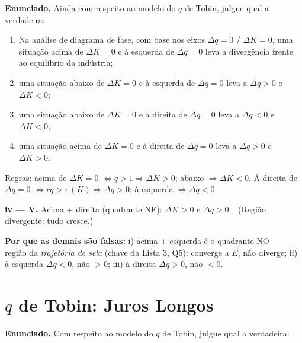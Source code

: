 \documentclass[12pt, a4paper]{article}
\begin{document}
\textbf{Enunciado.} Ainda com respeito ao modelo do $q$ de Tobin, julgue qual
a verdadeira:

\begin{enumerate}[label=\roman*)]
\item Na análise de diagrama de fase, com base nos eixos $\Delta q = 0$ /
$\Delta K = 0$, uma situação acima de $\Delta K = 0$ e à esquerda de
$\Delta q = 0$ leva a divergência frente ao equilíbrio da indústria;
\item uma situação abaixo de $\Delta K = 0$ e à esquerda de $\Delta q = 0$
leva a $\Delta q > 0$ e $\Delta K < 0$;
\item uma situação abaixo de $\Delta K = 0$ e à direita de $\Delta q = 0$
leva a $\Delta q < 0$ e $\Delta K < 0$;
\item uma situação acima de $\Delta K = 0$ e à direita de $\Delta q = 0$
leva a $\Delta q > 0$ e $\Delta K > 0$.
\end{enumerate}

\begin{correctbox}[title={Resposta: iv) --- puro sinal dos quadrantes}]
Regras: acima de $\Delta K = 0$ $\Leftrightarrow q > 1 \Rightarrow
\Delta K > 0$; abaixo $\Rightarrow \Delta K < 0$. À direita de
$\Delta q = 0$ $\Leftrightarrow rq > \pi(K) \Rightarrow \Delta q > 0$; à
esquerda $\Rightarrow \Delta q < 0$.

\textbf{iv --- V.} Acima + direita (quadrante NE): $\Delta K > 0$ e
$\Delta q > 0$. \checkmark\ (Região divergente: tudo cresce.)

\textbf{Por que as demais são falsas:} i) acima + esquerda é o quadrante NO
--- região da \emph{trajetória de sela} (chave da Lista 3, Q5): converge a
$E$, não diverge; ii) à esquerda $\Delta q < 0$, não $> 0$; iii) à direita
$\Delta q > 0$, não $< 0$.
\end{correctbox}

\section{$q$ de Tobin: Juros Longos}

\textbf{Enunciado.} Com respeito ao modelo do $q$ de Tobin, julgue qual a
verdadeira:
\end{document}
